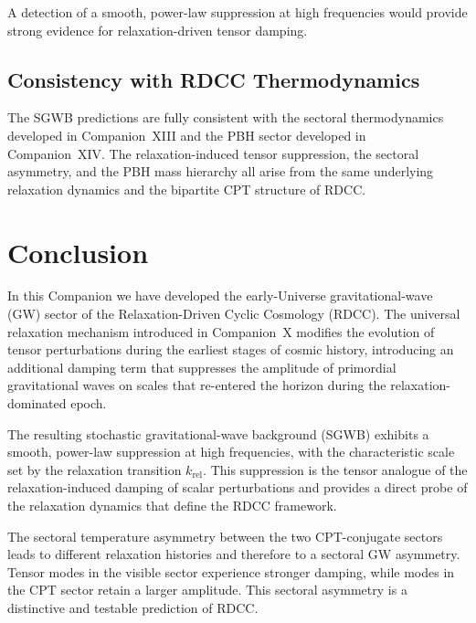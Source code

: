 \documentclass[11pt,a4paper]{article}
\begin{document}
A detection of a smooth, power-law suppression at high frequencies would provide strong
evidence for relaxation-driven tensor damping.


\subsection{Consistency with RDCC Thermodynamics}

The SGWB predictions are fully consistent with the sectoral thermodynamics developed in
Companion~XIII and the PBH sector developed in Companion~XIV. The relaxation-induced
tensor suppression, the sectoral asymmetry, and the PBH mass hierarchy all arise from the same
underlying relaxation dynamics and the bipartite CPT structure of RDCC.


\section{Conclusion}

In this Companion we have developed the early-Universe gravitational-wave (GW) sector of the
Relaxation-Driven Cyclic Cosmology (RDCC). The universal relaxation mechanism introduced in
Companion~X modifies the evolution of tensor perturbations during the earliest stages of cosmic
history, introducing an additional damping term that suppresses the amplitude of primordial
gravitational waves on scales that re-entered the horizon during the relaxation-dominated epoch.

The resulting stochastic gravitational-wave background (SGWB) exhibits a smooth, power-law
suppression at high frequencies, with the characteristic scale set by the relaxation transition
\(k_{\mathrm{rel}}\). This suppression is the tensor analogue of the relaxation-induced damping of scalar
perturbations and provides a direct probe of the relaxation dynamics that define the RDCC
framework.

The sectoral temperature asymmetry between the two CPT-conjugate sectors leads to different
relaxation histories and therefore to a sectoral GW asymmetry. Tensor modes in the visible
sector experience stronger damping, while modes in the CPT sector retain a larger amplitude.
This sectoral asymmetry is a distinctive and testable prediction of RDCC.
\end{document}
